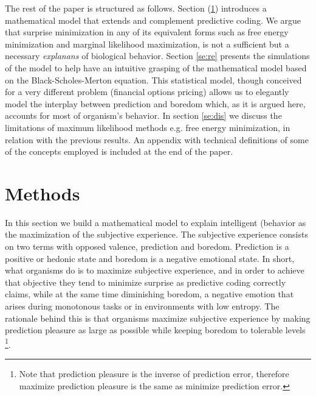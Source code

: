 \documentclass[11pt, onecolumn]{article}
\begin{document}

The rest of the paper is structured as follows. Section (\ref{se:methods})  introduces a mathematical model that extends and complement predictive coding. We argue that surprise minimization in any of its equivalent forms such as free energy minimization and marginal likelihood maximization, is not a sufficient but a necessary \emph{explanans} of biological behavior. Section \ref{se:re} presents the simulations of the model to help have an intuitive grasping of the mathematical model based on the Black-Scholes-Merton equation. This statistical model, though conceived for a very different problem (financial options pricing) allows us to elegantly model the interplay between prediction and boredom which, as it is argued here, accounts for most of organism's behavior.
In section \ref{se:dis} we discuss the limitations of maximum likelihood methods e.g. free energy minimization, in relation with the previous results.
An appendix with technical definitions of some of the concepts employed is included at the end of the paper.

\section{Methods}
\label{se:methods}

In this section we build a mathematical model to explain intelligent (behavior as the maximization of the subjective experience.  %
The subjective experience consists on two terms with opposed valence, prediction and boredom. Prediction is a positive or hedonic state and boredom is a negative emotional state. In short, what organisms do is to maximize subjective experience, and in order to achieve that objective they tend to minimize surprise as predictive coding correctly claims, while at the same time diminishing boredom, a negative emotion that arises during monotonous tasks or in environments with low entropy. The rationale behind this is that organisms maximize subjective experience by making prediction pleasure as large as possible while keeping boredom to tolerable levels \footnote{Note that prediction pleasure is the inverse of prediction error, therefore maximize prediction pleasure is the same as minimize prediction error.}.

\end{document}
